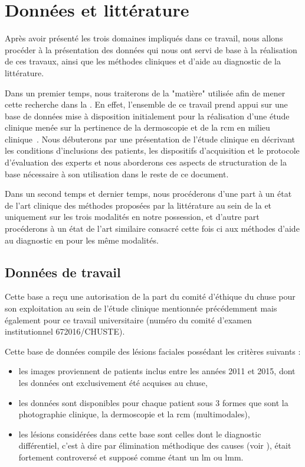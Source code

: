 \chapter{Données et littérature}
\label{chap:chapter_31}
\chapterintro
Après avoir présenté les trois domaines impliqués dans ce travail, nous allons procéder à la présentation des données qui nous ont servi de base à la réalisation de ces travaux, ainsi que les méthodes cliniques et d'aide au diagnostic de la littérature.\par

Dans un premier temps, nous traiterons de la "matière" utilisée afin de mener cette recherche dans la . En effet, l'ensemble de ce travail prend appui sur une base de données mise à disposition initialement pour la réalisation d'une étude clinique menée sur la pertinence de la dermoscopie et de la \gls{rcm} en milieu clinique~\cite{Cinotti2018}. Nous débuterons par une présentation de l'étude clinique en décrivant les conditions d'inclusions des patients, les dispositifs d'acquisition et le protocole d'évaluation des experts et nous aborderons ces aspects de structuration de la base nécessaire à son utilisation dans le reste de ce document.\par

Dans un second temps et dernier temps, nous procéderons d'une part à un état de l'art clinique des méthodes proposées par la littérature au sein de la  et uniquement sur les trois modalités en notre possession, et d'autre part procéderons à un état de l'art similaire consacré cette fois ci aux méthodes d'aide au diagnostic en  pour les même modalités.\par
\newpage

\section{Données de travail}
\label{sec:clinical_data}
Cette base a reçu une autorisation de la part du comité d'éthique du \gls{chuse} pour son exploitation au sein de l'étude clinique mentionnée précédemment mais également pour ce travail universitaire (numéro du comité d'examen institutionnel 672016/CHUSTE).\par

Cette base de données compile des lésions faciales possédant les critères suivants :
\begin{itemize}
    \item les images proviennent de patients inclus entre les années 2011 et 2015, dont les données ont exclusivement été acquises au \gls{chuse},
    \item les données sont disponibles pour chaque patient sous 3 formes que sont la photographie clinique, la dermoscopie et la \gls{rcm} (multimodales),
    \item les lésions considérées dans cette base sont celles dont le diagnostic différentiel, c'est à dire par élimination méthodique des causes (voir
    ), était fortement controversé et supposé comme étant un \gls{lm} ou \gls{lmm}.
\end{itemize}\par

